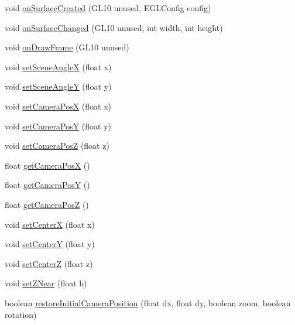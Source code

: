\begin{DoxyCompactItemize}
\item 
void \hyperlink{classandroid_1_1app_1_1printerapp_1_1viewer_1_1_viewer_renderer_aabf5b86c9c0cfc757ee86dc84384bb88}{on\+Surface\+Created} (G\+L10 unused, E\+G\+L\+Config config)
\item 
void \hyperlink{classandroid_1_1app_1_1printerapp_1_1viewer_1_1_viewer_renderer_a0f50b703d98d2380b770cc88f62f3286}{on\+Surface\+Changed} (G\+L10 unused, int width, int height)
\item 
void \hyperlink{classandroid_1_1app_1_1printerapp_1_1viewer_1_1_viewer_renderer_ab334624b1951664f2c973b73039f57e7}{on\+Draw\+Frame} (G\+L10 unused)
\item 
void \hyperlink{classandroid_1_1app_1_1printerapp_1_1viewer_1_1_viewer_renderer_a67e4e96bb538ff56f1c81c53f640cd08}{set\+Scene\+AngleX} (float x)
\item 
void \hyperlink{classandroid_1_1app_1_1printerapp_1_1viewer_1_1_viewer_renderer_a7dc8ab17f526c9344ba927ce6293daab}{set\+Scene\+AngleY} (float y)
\item 
void \hyperlink{classandroid_1_1app_1_1printerapp_1_1viewer_1_1_viewer_renderer_a54b818d322573ee1aaf3d13d7062108a}{set\+Camera\+PosX} (float x)
\item 
void \hyperlink{classandroid_1_1app_1_1printerapp_1_1viewer_1_1_viewer_renderer_a5fa54b4252b9f925da1067736b06b5d2}{set\+Camera\+PosY} (float y)
\item 
void \hyperlink{classandroid_1_1app_1_1printerapp_1_1viewer_1_1_viewer_renderer_aed26f432c33c000a560b272f05156ece}{set\+Camera\+PosZ} (float z)
\item 
float \hyperlink{classandroid_1_1app_1_1printerapp_1_1viewer_1_1_viewer_renderer_ae05b3a76df0d2f79769f829fc26015f4}{get\+Camera\+PosX} ()
\item 
float \hyperlink{classandroid_1_1app_1_1printerapp_1_1viewer_1_1_viewer_renderer_ae31d42984a2cf2ea44bb29122324d268}{get\+Camera\+PosY} ()
\item 
float \hyperlink{classandroid_1_1app_1_1printerapp_1_1viewer_1_1_viewer_renderer_a988407dff3d43750b4232b07981df15c}{get\+Camera\+PosZ} ()
\item 
void \hyperlink{classandroid_1_1app_1_1printerapp_1_1viewer_1_1_viewer_renderer_a49908b2f8f7bbc5a12fbd9fda1ac8d7d}{set\+CenterX} (float x)
\item 
void \hyperlink{classandroid_1_1app_1_1printerapp_1_1viewer_1_1_viewer_renderer_aa1142d361f3be508c2f554247ad029b0}{set\+CenterY} (float y)
\item 
void \hyperlink{classandroid_1_1app_1_1printerapp_1_1viewer_1_1_viewer_renderer_a44fdf691d553793e9c8403a0c3054037}{set\+CenterZ} (float z)
\item 
void \hyperlink{classandroid_1_1app_1_1printerapp_1_1viewer_1_1_viewer_renderer_a6a1ade69f82c22dc953868eb9c9fc8fa}{set\+Z\+Near} (float h)
\item 
boolean \hyperlink{classandroid_1_1app_1_1printerapp_1_1viewer_1_1_viewer_renderer_ae47bf1ddc58ccdc85df2df0d89442c19}{restore\+Initial\+Camera\+Position} (float dx, float dy, boolean zoom, boolean rotation)
\end{DoxyCompactItemize}
